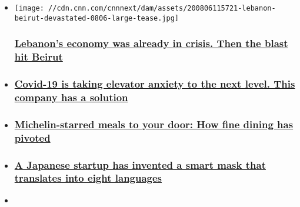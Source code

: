 \begin{itemize}
\item
  \href{/2020/08/06/economy/lebanon-economy-beirut-blast-imf/index.html}{}

  \texttt{[image: //cdn.cnn.com/cnnnext/dam/assets/200806115721-lebanon-beirut-devastated-0806-large-tease.jpg]}

  \hypertarget{lebanons-economy-was-already-in-crisis-then-the-blast-hit-beirut}{%
  \subsubsection{\texorpdfstring{\href{/2020/08/06/economy/lebanon-economy-beirut-blast-imf/index.html}{Lebanon's
  economy was already in crisis. Then the blast hit
  Beirut}}{Lebanon's economy was already in crisis. Then the blast hit Beirut}}\label{lebanons-economy-was-already-in-crisis-then-the-blast-hit-beirut}}
\item
  \hypertarget{covid-19-is-taking-elevator-anxiety-to-the-next-level-this-company-has-a-solution}{%
  \subsubsection{\texorpdfstring{\href{/2020/08/03/business/india-touchless-elevator-buttons-hnk-spc-intl/index.html}{Covid-19
  is taking elevator anxiety to the next level. This company has a
  solution}}{Covid-19 is taking elevator anxiety to the next level. This company has a solution}}\label{covid-19-is-taking-elevator-anxiety-to-the-next-level-this-company-has-a-solution}}
\item
  \hypertarget{michelin-starred-meals-to-your-door-how-fine-dining-has-pivoted}{%
  \subsubsection{\texorpdfstring{\href{/2020/08/03/business/singapore-virtual-dining-it-spc-intl/index.html}{Michelin-starred
  meals to your door: How fine dining has
  pivoted}}{Michelin-starred meals to your door: How fine dining has pivoted}}\label{michelin-starred-meals-to-your-door-how-fine-dining-has-pivoted}}
\item
  \hypertarget{a-japanese-startup-has-invented-a-smart-mask-that-translates-into-eight-languages}{%
  \subsubsection{\texorpdfstring{\href{/2020/08/03/business/japanese-robotics-smart-face-mask-spc-intl/index.html}{A
  Japanese startup has invented a smart mask that translates into eight
  languages}}{A Japanese startup has invented a smart mask that translates into eight languages}}\label{a-japanese-startup-has-invented-a-smart-mask-that-translates-into-eight-languages}}
\item
  \hypertarget{the-tiny-islands-quietly-mastering-hydrogen-power}{%
}
\end{itemize}
